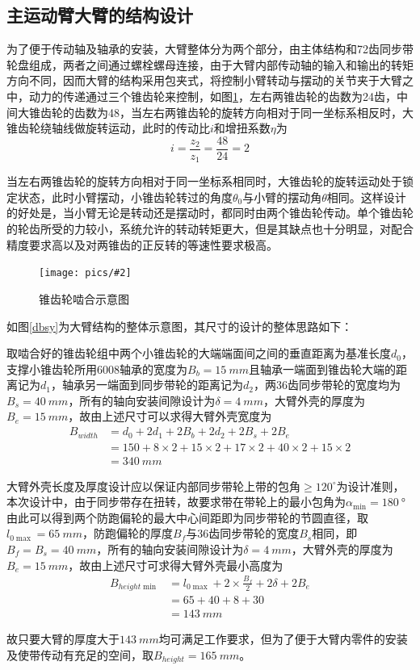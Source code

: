 \documentclass[UTF8]{article}%
\newcommand{\p}[4][0.5]{\begin{figure}[h]\centering\texttt{[image: pics/\#2]}\\\caption{#3}\label{#4}\end{figure}}%
\newcommand{\n}{\par}%
\begin{document}
\begin{spacing}{1.5}
	\subsection{主运动臂大臂的结构设计}
	为了便于传动轴及轴承的安装，大臂整体分为两个部分，由主体结构和72齿同步带轮盘组成，两者之间通过螺栓螺母连接，由于大臂内部传动轴的输入和输出的转矩方向不同，因而大臂的结构采用包夹式，将控制小臂转动与摆动的关节夹于大臂之中，动力的传递通过三个锥齿轮来控制，如图\ref{zcl}，左右两锥齿轮的齿数为24齿，中间大锥齿轮的齿数为48，当左右两锥齿轮的旋转方向相对于同一坐标系相反时，大锥齿轮绕轴线做旋转运动，此时的传动比$i$和增扭系数$\eta$为$$i=\frac{z_2}{z_1}=\frac{48}{24}=2$$\n
	当左右两锥齿轮的旋转方向相对于同一坐标系相同时，大锥齿轮的旋转运动处于锁定状态，此时小臂摆动，小锥齿轮转过的角度$\theta_0$与小臂的摆动角$\theta$相同。这样设计的好处是，当小臂无论是转动还是摆动时，都同时由两个锥齿轮传动。单个锥齿轮的轮齿所受的力较小，系统允许的转动转矩更大，但是其缺点也十分明显，对配合精度要求高以及对两锥齿的正反转的等速性要求极高。\n
	\p[0.1]{锥齿轮啮合示意图.PDF}{锥齿轮啮合示意图}{zcl}
	如图\ref{dbsy}为大臂结构的整体示意图，其尺寸的设计的整体思路如下：\n
	取啮合好的锥齿轮组中两个小锥齿轮的大端端面间之间的垂直距离为基准长度$d_0$，支撑小锥齿轮所用6008轴承的宽度为$B_b=\SI{15}{mm}$且轴承一端面到锥齿轮大端的距离记为$d_1$，轴承另一端面到同步带轮的距离记为$d_2$，两36齿同步带轮的宽度均为$B_s=\SI{40}{mm}$，所有的轴向安装间隙设计为$\delta=\SI{4}{mm}$，大臂外壳的厚度为$B_e=\SI{15}{mm}$，故由上述尺寸可以求得大臂外壳宽度为
	\begin{align*}
		B_{width}&=d_0+2d_1+2B_b+2d_2+2B_s+2B_e\\
		&=150+8\times2+15\times2+17\times2+40\times2+15\times2\\
		&=\SI{340}{mm}
	\end{align*}\n
	大臂外壳长度及厚度设计应以保证内部同步带轮上带的包角$\geqslant120^{\circ}$为设计准则，本次设计中，由于同步带存在扭转，故要求带在带轮上的最小包角为$\alpha_{\min}=\SI{180}{°}$由此可以得到两个防跑偏轮的最大中心间距即为同步带轮的节圆直径，取$l_{0\max}=\SI{65}{mm}$，防跑偏轮的厚度$B_f$与36齿同步带轮的宽度$B_s$相同，即$B_f=B_s=\SI{40}{mm}$，所有的轴向安装间隙设计为$\delta=\SI{4}{mm}$，大臂外壳的厚度为$B_e=\SI{15}{mm}$，故由上述尺寸可求得大臂外壳最小高度为
	\begin{align*}
		B_{height\min}&=l_{0\max}+2\times\frac{B_f}{2}+2\delta+2B_e\\
		&=65+40+8+30\\
		&=\SI{143}{mm}
	\end{align*}\n
	故只要大臂的厚度大于$\SI{143}{mm}$均可满足工作要求，但为了便于大臂内零件的安装及使带传动有充足的空间，取$B_{height}=\SI{165}{mm}$。\n

\end{spacing}
\end{document}
